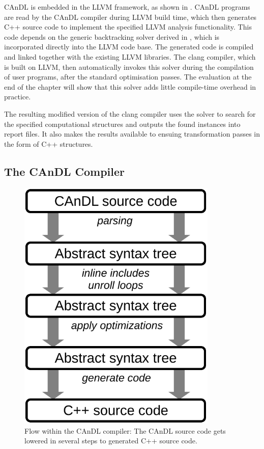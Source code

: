     CAnDL is embedded in the LLVM framework, as shown in .
    CAnDL programs are read by the CAnDL compiler during LLVM build time, which
    then generates C++ source code to implement the specified LLVM analysis
    functionality.
    This code depends on the generic backtracking solver derived in
    , which is incorporated directly into the LLVM code
    base.
    The generated code is compiled and linked together with the existing LLVM
    libraries.
    The clang compiler, which is built on LLVM, then automatically invokes this
    solver during the compilation of user programs, after the standard
    optimisation passes.
    The evaluation at the end of the chapter will show that this solver adds
    little compile-time overhead in practice.

    The resulting modified version of the clang compiler uses the solver to
    search for the specified computational structures and outputs the found
    instances into report files.
    It also makes the results available to ensuing transformation passes in the
    form of C++ structures.

\subsection{The CAnDL Compiler}

\begin{figure}[t]
\centering
\begin{minipage}{0.7\textwidth}
\centering
\includegraphics[width=0.85\textwidth]{figures/candlstages.pdf}
\caption{Flow within the CAnDL compiler:
         The CAnDL source code gets lowered in several steps to generated C++
         source code.\parfillskip=0pt}
\label{fig:compilerflow}
\end{minipage}
\end{figure}

